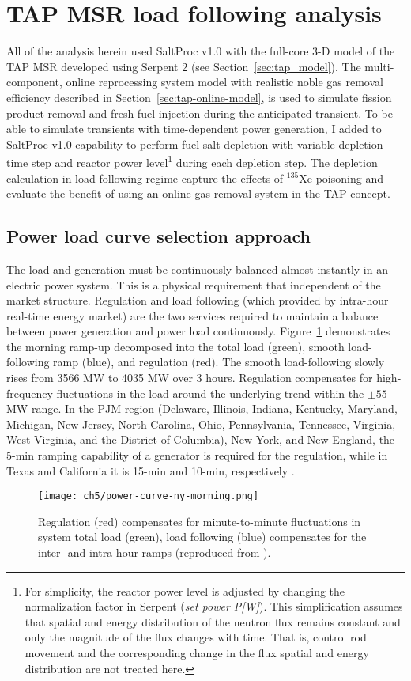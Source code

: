 \section{TAP MSR load following analysis}
All of the analysis herein used SaltProc v1.0 with the full-core 3-D model of 
the \gls{TAP} \gls{MSR} developed using Serpent 2 (see 
Section~\ref{sec:tap_model}). The multi-component, online reprocessing system 
model with realistic noble gas removal efficiency described in 
Section~\ref{sec:tap-online-model}, is used to simulate fission product 
removal 
and fresh fuel injection during the anticipated transient. To be able to 
simulate transients with time-dependent power generation, I added to SaltProc 
v1.0 capability to perform fuel salt depletion with variable depletion time 
step and reactor power level\footnote{For simplicity, the reactor power level 
is adjusted by changing the normalization factor in Serpent (\emph{set power 
P[W]}). This simplification assumes that spatial and energy distribution of 
the neutron flux remains constant and only the magnitude of the flux changes 
with time. That is, control rod movement and the corresponding change in the 
flux spatial and energy distribution are not treated here.} during each 
depletion step. The depletion calculation in load following regime capture the 
effects of $^{135}$Xe poisoning and evaluate the benefit of using an online 
gas removal system in the \gls{TAP} concept.

\subsection{Power load curve selection approach}\label{sec:worst-load}
The load and generation must be continuously balanced almost instantly  in an 
electric power system. This is a physical requirement that independent of the 
market structure. Regulation and load following (which provided by intra-hour 
real-time energy market) are the two services required to maintain a balance 
between power generation and power load continuously. 
Figure~\ref*{fig:power-curve-ny} demonstrates the morning ramp-up decomposed 
into the total load (green), smooth load-following ramp (blue), and regulation 
(red). The smooth load-following slowly rises from 3566 MW to 4035 MW over 3 
hours. Regulation compensates for high-frequency fluctuations in the load 
around the underlying trend within the $\pm55$MW range. In the PJM region 
(Delaware, Illinois, Indiana, Kentucky, Maryland, Michigan, New Jersey, North 
Carolina, Ohio, Pennsylvania, Tennessee, Virginia, West Virginia, and the 
District of Columbia), New York, and New England, the 5-min ramping capability 
of a generator is required for the regulation, while in Texas and California 
it is 15-min and 10-min, respectively \cite{kirby_method_2005}.
\begin{figure}[htp!] %
	\centering
	\texttt{[image: ch5/power-curve-ny-morning.png]}
	\caption{Regulation (red) compensates for minute-to-minute fluctuations in 
	system total load (green), load following (blue) compensates for the 
	inter- and intra-hour ramps (reproduced from \cite{kirby_method_2005}).}
	\label{fig:power-curve-ny}
\end{figure}

